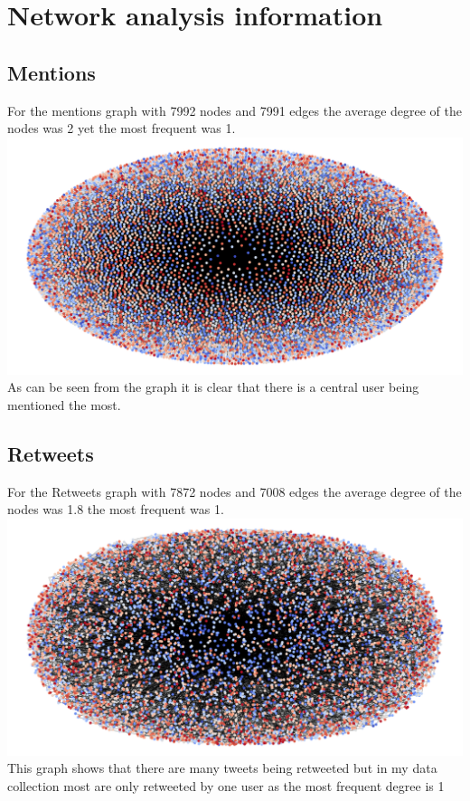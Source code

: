 \documentclass[10pt,a4paper]{article}
\begin{document}
	
\section{Network analysis information}	

 	\subsection*{Mentions}
 	For the mentions graph with 7992 nodes and 7991 edges the average degree of the nodes was 2 yet the most frequent was 1.
 	\includegraphics[width=\textwidth]{images/mentions_graph.png}
 	As can be seen from the graph it is clear that there is a central user being mentioned the most.
 	
 	
 	\subsection*{Retweets}
 	For the Retweets graph with 7872 nodes and 7008 edges the average degree of the nodes was 1.8 the most frequent was 1.
 	\includegraphics[width=\textwidth]{images/retweets_graph.png} 
 	This graph shows that there are many tweets being retweeted but in my data collection most are only retweeted by one user as the most frequent degree is 1
\end{document}
